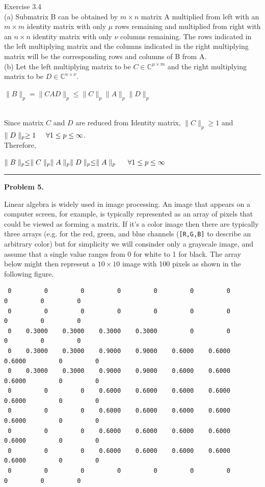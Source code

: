 \documentclass[10pt]{article}
\newcommand\tab[1][0.5cm]{\hspace*{#1}}
\begin{document}
Exercise 3.4\\
(a) Submatrix B can be obtained by $m \times n$ matrix A multiplied from left with an $m \times m$ identity matrix with only $\mu$ rows remaining and multiplied from right with an $n \times n$ identity matrix with only $\nu$ columns remaining. The rows indicated in the left multiplying matrix and the columns indicated in the right multiplying matrix will be the corresponding rows and columns of B from A.\\

(b)
Let the left multiplying matrix to be $C \in \mathbb{C}^{\mu \times m}$ and the right multiplying matrix to be $D \in \mathbb{C}^{n \times \nu}$.\\
\centerline {$\parallel B\parallel_p = \parallel CAD\parallel_p \leq \parallel C\parallel_p\parallel A\parallel_p\parallel D\parallel_p$}\\
Since matrix $C$ and $D$ are reduced from Identity matrix, $\parallel C\parallel_p \geq 1$ and  $\parallel D\parallel_p \geq 1 \tab \forall 1 \leq p \leq \infty$.\\
Therefore,\\
\centerline {$\parallel B\parallel_p \leq \parallel C\parallel_p\parallel A\parallel_p\parallel D\parallel_p \leq \parallel A\parallel_p \tab \forall 1 \leq p \leq \infty$}






\vskip 1cm
\hrule
{\bf Problem 5.}

Linear algebra is widely used in image processing.  An
image that appears on a computer screen, for example, is typically
represented as an array of pixels that could be viewed as forming
a matrix.  If it's a color image then there are typically three
arrays (e.g. for the red, green, and blue channels ({\tt [R,G,B]}
to describe an arbitrary color) but for simplicity we will consinder
only a grayscale image, and assume that a single value ranges from
0 for white to 1 for black.  The array below might then represent
a $10 \times 10$ image with 100 pixels as shown in the following figure.

\begin{verbatim}
 0         0         0         0         0         0         0         0         0         0
 0         0         0         0         0         0         0         0         0         0
 0    0.3000    0.3000    0.3000    0.3000         0         0         0         0         0
 0    0.3000    0.3000    0.9000    0.9000    0.6000    0.6000    0.6000         0         0
 0    0.3000    0.3000    0.9000    0.9000    0.6000    0.6000    0.6000         0         0
 0         0         0    0.6000    0.6000    0.6000    0.6000    0.6000         0         0
 0         0         0    0.6000    0.6000    0.6000    0.6000    0.6000         0         0
 0         0         0    0.6000    0.6000    0.6000    0.6000    0.6000         0         0
 0         0         0    0.6000    0.6000    0.6000    0.6000    0.6000         0         0
 0         0         0         0         0         0         0         0         0         0
\end{verbatim}
\end{document}
